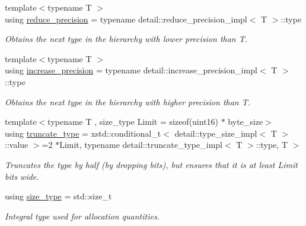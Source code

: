 \begin{DoxyCompactItemize}
{\footnotesize template$<$typename T $>$ }\\using \hyperlink{namespacegko_ab5d71c1f4bd1b654df1e561ea7a811f2}{reduce\+\_\+precision} = typename detail\+::reduce\+\_\+precision\+\_\+impl$<$ T $>$\+::type
\begin{DoxyCompactList}\small\item\em Obtains the next type in the hierarchy with lower precision than T. \end{DoxyCompactList}\item 
\mbox{\label{namespacegko_a373c2b4782d95e675d7e91a75bab101d}} 
{\footnotesize template$<$typename T $>$ }\\using \hyperlink{namespacegko_a373c2b4782d95e675d7e91a75bab101d}{increase\+\_\+precision} = typename detail\+::increase\+\_\+precision\+\_\+impl$<$ T $>$\+::type
\begin{DoxyCompactList}\small\item\em Obtains the next type in the hierarchy with higher precision than T. \end{DoxyCompactList}\item 
\mbox{\label{namespacegko_abf540a6830b3ac4cd6b193133510f4d7}} 
{\footnotesize template$<$typename T , size\+\_\+type Limit = sizeof(uint16) $\ast$ byte\+\_\+size$>$ }\\using \hyperlink{namespacegko_abf540a6830b3ac4cd6b193133510f4d7}{truncate\+\_\+type} = xstd\+::conditional\+\_\+t$<$ detail\+::type\+\_\+size\+\_\+impl$<$ T $>$\+::value $>$=2 $\ast$Limit, typename detail\+::truncate\+\_\+type\+\_\+impl$<$ T $>$\+::type, T $>$
\begin{DoxyCompactList}\small\item\em Truncates the type by half (by dropping bits), but ensures that it is at least {\ttfamily Limit} bits wide. \end{DoxyCompactList}\item 
\mbox{\label{namespacegko_a6e5c95df0ae4e47aab2f604a22d98ee7}} 
using \hyperlink{namespacegko_a6e5c95df0ae4e47aab2f604a22d98ee7}{size\+\_\+type} = std\+::size\+\_\+t
\begin{DoxyCompactList}\small\item\em Integral type used for allocation quantities. \end{DoxyCompactList}\item 
\mbox{\label{namespacegko_ad7a8c26c7cb547663bff3cc1df3c8db0}} 

\end{DoxyCompactItemize}

